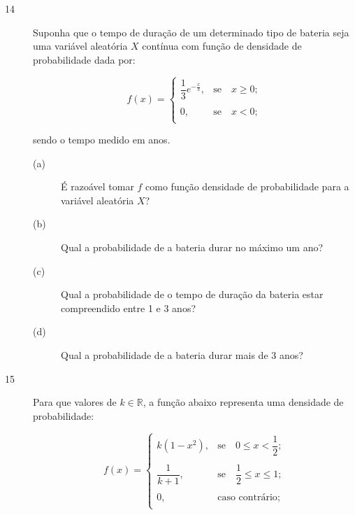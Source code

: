 \documentclass{report}
\begin{document}
\begin{description}

\item[{\large 14}] Suponha que o tempo de duração de um determinado tipo de bateria seja uma variável aleatória $X$ contínua com função de densidade de probabilidade dada por:

    \begin{center}
\begin{displaymath}
f(x)=\left\{
\begin{array}{ccccc}
\dfrac{1}{3}e^{-\frac{x}{3}},&\textrm{se}\quad x\geq 0;\\
&\\
0,& \textrm{se}\quad x<0;\\
\end{array}
\right.
\end{displaymath}
\end{center}
 sendo o tempo medido em anos.

\begin{description}

\item[(a)] É razoável tomar $f$ como função densidade de probabilidade para a variável aleatória $X$?
\item[(b)] Qual a probabilidade de a bateria durar no máximo um ano?
\item[(c)] Qual a probabilidade de o tempo de duração da bateria estar compreendido entre 1 e 3 anos?
\item[(d)] Qual a probabilidade de a bateria durar mais de 3 anos?
\end{description}

\end{description}

\begin{description}

\item[{\large 15}] Para que valores de $k\in \mathbb{R}$, a função abaixo representa uma densidade de probabilidade:

    \begin{center}
\begin{displaymath}
f(x)=\left\{
\begin{array}{ccccc}
k(1-x^{2}),&\textrm{se}\quad 0\leq x< \dfrac{1}{2};\\
&\\
\dfrac{1}{k+1},&\textrm{se}\quad \dfrac{1}{2}\leq x\leq 1;\\
&\\
0,& \textrm{caso contrário};\\
\end{array}
\right.
\end{displaymath}
\end{center}

\end{description}
\end{document}
